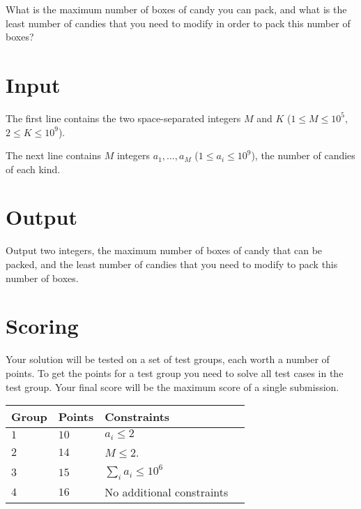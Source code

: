 What is the maximum number of boxes of candy you can pack, and what is the least number of candies that you need to modify in order to pack this number of boxes?

\section*{Input}
The first line contains the two space-separated integers $M$ and $K$ ($1 \le M \le 10^5$, $2 \le K \le 10^9$).

The next line contains $M$ integers $a_1, \dots, a_M$ ($1 \le a_i \le 10^9$), the number of candies of each kind.

\section*{Output}
Output two integers, the maximum number of boxes of candy that can be packed, and the least number of candies that you need to modify to pack this number of boxes.

\section*{Scoring}
Your solution will be tested on a set of test groups, each worth a number of points.
To get the points for a test group you need to solve all test cases in the test group.
Your final score will be the maximum score of a single submission.

\noindent
\begin{tabular}{| l | l | l | l |}
\hline
Group & Points & Constraints \\ \hline
$1$   & $10$   & $a_i \le 2$ \\ \hline
$2$   & $14$   & $M \le 2$. \\ \hline
$3$   & $15$   & $\sum_i{a_i} \le 10^6$\\ \hline
$4$   & $16$   & No additional constraints\\ \hline
\end{tabular}
